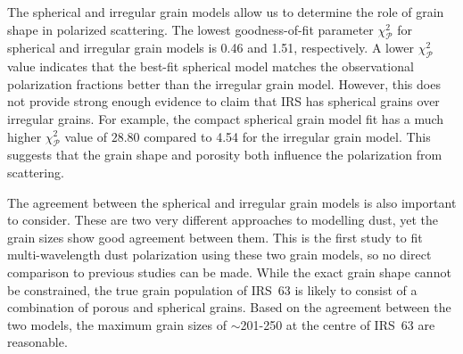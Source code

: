 The spherical and irregular grain models allow us to determine the role of grain shape in polarized scattering. The lowest goodness-of-fit parameter $\chi_\mathcal{P}^2$ for spherical and irregular grain models is 0.46 and 1.51, respectively. A lower $\chi_\mathcal{P}^2$ value indicates that the best-fit spherical model matches the observational polarization fractions better than the irregular grain model. However, this does not provide strong enough evidence to claim that IRS has spherical grains over irregular grains. For example, the compact spherical grain model fit has a much higher $\chi_\mathcal{P}^2$ value of $28.80$ compared to 4.54 for the irregular grain model. This suggests that the grain shape and porosity both influence the polarization from scattering.



The agreement between the spherical and irregular grain models is also important to consider. These are two very different approaches to modelling dust, yet the grain sizes show good agreement between them. This is the first study to fit multi-wavelength dust polarization using these two grain models, so no direct comparison to previous studies can be made. While the exact grain shape cannot be constrained, the true grain population of IRS~63 is likely to consist of a combination of porous and spherical grains. Based on the agreement between the two models, the maximum grain sizes of $\sim$201-250 \micron at the centre of IRS~63 are reasonable. 









